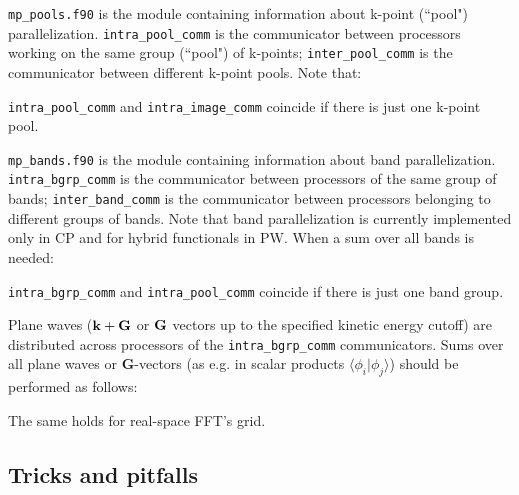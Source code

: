 \documentclass[12pt,a4paper]{article}
\begin{document}
\texttt{mp\_pools.f90} is the module containing information about k-point
(``pool") parallelization. \texttt{intra\_pool\_comm} is the communicator
between processors working on the same group (``pool") of k-points;
\texttt{inter\_pool\_comm} is the communicator between different
k-point pools. Note that:
\begin{quote}
\end{quote}
{\tt intra\_pool\_comm} and {\tt intra\_image\_comm} coincide if there
is just one k-point pool.

\texttt{mp\_bands.f90} is the module containing information about band
parallelization. \texttt{intra\_bgrp\_comm} is the communicator between
processors of the same group of bands; \texttt{inter\_band\_comm} is the
communicator between processors belonging to different groups of bands.
Note that band parallelization is currently implemented only in CP and
for hybrid functionals in PW. When a sum over all bands is needed:
\begin{quote}
\end{quote}
{\tt intra\_bgrp\_comm} and {\tt intra\_pool\_comm} coincide
if there is just one band group.

Plane waves (${\bf k}+{\bf G}$ or ${\bf G}$ vectors up to the specified
kinetic energy cutoff) are distributed across processors of the
{\tt intra\_bgrp\_comm} communicators. Sums over all plane waves
or {\bf G}-vectors (as e.g. in scalar products $\langle\phi_i|\phi_j\rangle$)
should be performed as follows:
\begin{quote}
\end{quote}
The same holds for real-space FFT's grid.

\subsection{Tricks and pitfalls}
\end{document}
